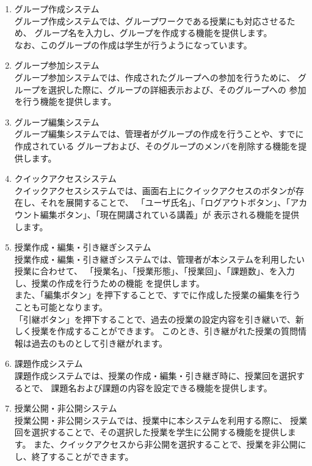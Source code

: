 \begin{enumerate}
\item グループ作成システム\\
グループ作成システムでは、グループワークである授業にも対応させるため、
グループ名を入力し、グループを作成する機能を提供します。\\
なお、このグループの作成は学生が行うようになっています。

\item グループ参加システム\\
グループ参加システムでは、作成されたグループへの参加を行うために、
グループを選択した際に、グループの詳細表示および、そのグループへの
参加を行う機能を提供します。

\item グループ編集システム\\
グループ編集システムでは、管理者がグループの作成を行うことや、すでに作成されている
グループおよび、そのグループのメンバを削除する機能を提供します。

\item クイックアクセスシステム\\
クイックアクセスシステムでは、画面右上にクイックアクセスのボタンが存在し、それを展開することで、
「ユーザ氏名」、「ログアウトボタン」、「アカウント編集ボタン」、「現在開講されている講義」が
表示される機能を提供します。

\item 授業作成・編集・引き継ぎシステム\\
授業作成・編集・引き継ぎシステムでは、管理者が本システムを利用したい授業に合わせて、
「授業名」、「授業形態」、「授業回」、「課題数」、を入力し、授業の作成を行うための機能
を提供します。\\
また、「編集ボタン」を押下することで、すでに作成した授業の編集を行うことも可能となります。\\
「引継ボタン」を押下することで、過去の授業の設定内容を引き継いで、新しく授業を作成することができます。
このとき、引き継がれた授業の質問情報は過去のものとして引き継がれます。

\item 課題作成システム\\
課題作成システムでは、授業の作成・編集・引き継ぎ時に、授業回を選択するとで、
課題名および課題の内容を設定できる機能を提供します。

\item 授業公開・非公開システム\\
授業公開・非公開システムでは、授業中に本システムを利用する際に、
授業回を選択することで、その選択した授業を学生に公開する機能を提供します。
また、クイックアクセスから非公開を選択することで、授業を非公開にし、終了することができます。


\end{enumerate}
